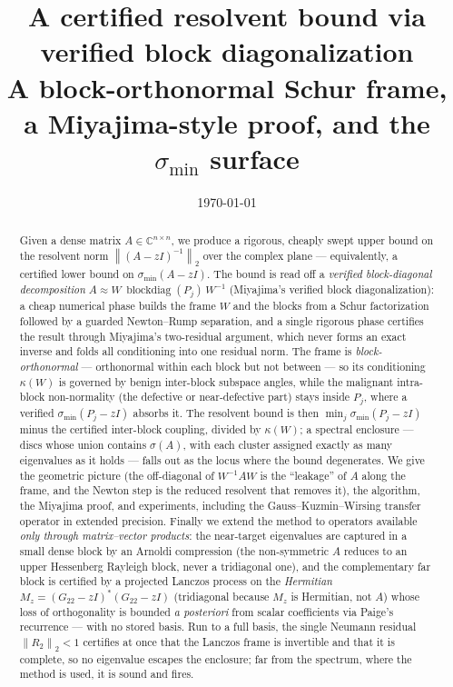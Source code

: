 \documentclass[11pt,a4paper]{article}
\title{\textbf{A certified resolvent bound via verified block diagonalization}\\[0.3em]
\large A block-orthonormal Schur frame, a Miyajima-style proof, and the $\sigma_{\min}$ surface}
\author{}
\date{\today}
\newcommand{\norm}[1]{\left\|#1\right\|}
\newcommand{\C}{\mathbb{C}}
\newcommand{\spec}{\sigma}
\theoremstyle{plain}
\theoremstyle{definition}
\begin{document}
\maketitle

\begin{abstract}
\noindent
Given a dense matrix $A\in\C^{n\times n}$, we produce a rigorous, cheaply swept upper
bound on the resolvent norm $\norm{(A-zI)^{-1}}_2$ over the complex plane ---
equivalently, a certified lower bound on $\sigma_{\min}(A-zI)$. The bound is read off a
\emph{verified block-diagonal decomposition} $A\approx W\,\operatorname{blockdiag}(P_j)\,W^{-1}$
(Miyajima's verified block diagonalization): a cheap numerical phase builds the frame $W$
and the blocks from a Schur factorization followed by a guarded Newton--Rump separation,
and a single rigorous phase certifies the result through Miyajima's two-residual argument,
which never forms an exact inverse and folds all conditioning into one residual norm. The
frame is \emph{block-orthonormal} --- orthonormal within each block but not between --- so
its conditioning $\kappa(W)$ is governed by benign inter-block subspace angles, while the
malignant intra-block non-normality (the defective or near-defective part) stays inside
$P_j$, where a verified $\sigma_{\min}(P_j-zI)$ absorbs it. The resolvent bound is then
$\min_j\sigma_{\min}(P_j-zI)$ minus the certified inter-block coupling, divided by
$\kappa(W)$; a spectral enclosure --- discs whose union contains $\spec(A)$, with each
cluster assigned exactly as many eigenvalues as it holds --- falls out as the locus where
the bound degenerates. We give the geometric picture (the off-diagonal of $W^{-1}AW$ is the
``leakage'' of $A$ along the frame, and the Newton step is the reduced resolvent that
removes it), the algorithm, the Miyajima proof, and experiments, including the
Gauss--Kuzmin--Wirsing transfer operator in extended precision. Finally we extend the
method to operators available \emph{only through matrix--vector products}: the near-target
eigenvalues are captured in a small dense block by an Arnoldi compression (the non-symmetric
$A$ reduces to an upper Hessenberg Rayleigh block, never a tridiagonal one), and the
complementary far block is certified by a projected Lanczos process on the \emph{Hermitian}
$M_z=(G_{22}-zI)^{*}(G_{22}-zI)$ (tridiagonal because $M_z$ is Hermitian, not $A$) whose loss
of orthogonality is bounded
\emph{a posteriori} from scalar coefficients via Paige's recurrence --- with no stored
basis. Run to a full basis, the single Neumann residual $\norm{R_2}_2<1$ certifies at once
that the Lanczos frame is invertible and that it is complete, so no eigenvalue escapes the
enclosure; far from the spectrum, where the method is used, it is sound and fires.
\end{abstract}
\end{document}
